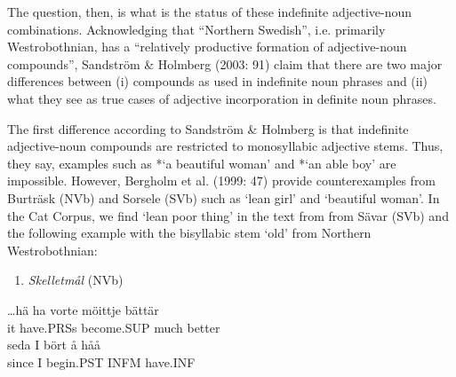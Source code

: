 The question, then, is what is the status of these indefinite adjective-noun combinations. Acknowledging that “Northern Swedish”, i.e. primarily Westrobothnian, has a “relatively productive formation of adjective-noun compounds”, Sandström \& Holmberg (2003: 91) claim that there are two major differences between (i) compounds as used in indefinite noun phrases and (ii) what they see as true cases of adjective incorporation in definite noun phrases.

The first difference according to Sandström \& Holmberg is that indefinite adjective-noun compounds are restricted to monosyllabic adjective stems. Thus, they say, examples such as *‘a beautiful woman’ and *‘an able boy’ are impossible. However, Bergholm et al. (1999: 47) provide counterexamples from Burträsk (NVb) and Sorsele (SVb) such as  ‘lean girl’ and  ‘beautiful woman’. In the Cat Corpus, we find  ‘lean poor thing’ in the text from from Sävar (SVb) and the following example with the bisyllabic stem  ‘old’ from Northern Westrobothnian:

\begin{enumerate} %
\item 
\textit{Skelletmål} (NVb)
\end{enumerate} %
\ea\label{}
\gll …hä  ha  vorte  möittje  bättär\\


it  have.PRSs  become.SUP  much  better\\ %


\ea\label{}
\gll seda  I  bört  å  håå\\


since  I  begin.PST  INFM  have.INF\\ %


